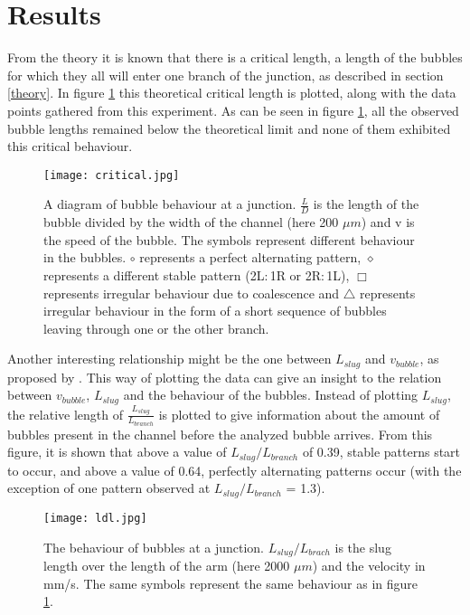 \section{Results}
\label{sec:results}
From the theory it is known that there is a critical length, a length of the bubbles for which they all will enter one branch of the junction, as described in section \ref{theory}. In figure \ref{fig:critical} this theoretical critical length is plotted, along with the data points gathered from this experiment. As can be seen in figure \ref{fig:critical}, all the observed bubble lengths remained below the theoretical limit and none of them exhibited this critical behaviour. 
\begin{figure}[ht]
\centering
\texttt{[image: critical.jpg]}
\caption{A diagram of bubble behaviour at a junction. $\frac{L}{D}$ is the length of the bubble divided by the width of the channel (here 200 $\mu m$) and v is the speed of the bubble. The symbols represent different behaviour in the bubbles. $\circ$ represents a perfect alternating pattern, $\diamond$ represents a different stable pattern (2L$\colon$1R or 2R$\colon$1L), $\Box$ represents irregular behaviour due to coalescence and $\triangle$ represents irregular behaviour in the form of a short sequence of bubbles leaving through one or the other branch.
}
\label{fig:critical}
\end{figure}
\par
Another interesting relationship might be the one between $L_{slug}$ and $v_{bubble}$, as proposed by \cite{bypass}. This way of plotting the data can give an insight to the relation between $v_{bubble}$, $L_{slug}$ and the behaviour of the bubbles. Instead of plotting $L_{slug}$, the relative length of $\frac{L_{slug}}{L_{branch}}$ is plotted to give information about the amount of bubbles present in the channel before the analyzed bubble arrives. From this figure, it is shown that above a value of $L_{slug}/L_{branch}$ of 0.39, stable patterns start to occur, and above a value of 0.64, perfectly alternating patterns occur (with the exception of one pattern observed at $L_{slug}/L_{branch}$ = 1.3). 
\begin{figure}[ht]
\centering
\texttt{[image: ldl.jpg]}
\caption{The behaviour of bubbles at a junction. $L_{slug}/L_{brach}$ is the slug length over the length of the arm (here 2000 $\mu m$) and the velocity in mm/s. The same symbols represent the same behaviour as in figure \ref{fig:critical}.}
\label{fig:ldl}
\end{figure}
